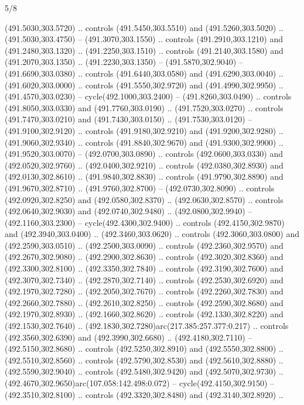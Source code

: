 \begin{flagdescription}{5/8}
\begin{scope}[xshift=0.5\flaglength,yshift=0.5\flagwidth,scale=\flagwidth/475.63]
\begin{scope}[y=0.8pt, x=0.8pt, yscale=-1, xscale=1,shift={(-450,-300)}]
\begin{scope}[cm={{1.0,0.0,0.0,1.0,(-0.0002,0.12556)}},cm={{1.0,0.0,0.0,1.0,(0.00179,0.0)}}]
\begin{scope}[cm={{1.11592,0.0,0.0,1.11592,(-106.89933,-41.77764)}}]
\begin{scope}[draw=black,fill=cfff]
\begin{scope}[fill=black]
  (491.5030,303.5720) .. controls (491.5450,303.5510) and (491.5260,303.5020) ..
  (491.5030,303.4750) -- (491.3070,303.1550) .. controls (491.2910,303.1210) and
  (491.2480,303.1320) .. (491.2250,303.1510) .. controls (491.2140,303.1580) and
  (491.2070,303.1350) .. (491.2230,303.1350) -- (491.5870,302.9040) --
  (491.6690,303.0380) .. controls (491.6440,303.0580) and (491.6290,303.0040) ..
  (491.6020,303.0000) .. controls (491.5550,302.9720) and (491.4990,302.9950) ..
  (491.4570,303.0230) -- cycle(492.1000,303.2400) -- (491.8260,303.0490) ..
  controls (491.8050,303.0330) and (491.7760,303.0190) .. (491.7520,303.0270) ..
  controls (491.7470,303.0210) and (491.7430,303.0150) .. (491.7530,303.0120) --
  (491.9100,302.9120) .. controls (491.9180,302.9210) and (491.9200,302.9280) ..
  (491.9060,302.9340) .. controls (491.8840,302.9670) and (491.9300,302.9900) ..
  (491.9520,303.0070) -- (492.0700,303.0890) .. controls (492.0600,303.0330) and
  (492.0520,302.9760) .. (492.0400,302.9210) .. controls (492.0380,302.8930) and
  (492.0130,302.8610) .. (491.9840,302.8830) .. controls (491.9790,302.8890) and
  (491.9670,302.8710) .. (491.9760,302.8700) -- (492.0730,302.8090) .. controls
  (492.0920,302.8250) and (492.0580,302.8370) .. (492.0630,302.8570) .. controls
  (492.0640,302.9030) and (492.0740,302.9480) .. (492.0800,302.9940) --
  (492.1160,303.2300) -- cycle(492.4300,302.9400) .. controls
  (492.4150,302.9870) and (492.3940,303.0400) .. (492.3460,303.0620) .. controls
  (492.3060,303.0800) and (492.2590,303.0510) .. (492.2500,303.0090) .. controls
  (492.2360,302.9570) and (492.2670,302.9080) .. (492.2900,302.8630) .. controls
  (492.3020,302.8360) and (492.3300,302.8100) .. (492.3350,302.7840) .. controls
  (492.3190,302.7600) and (492.3070,302.7340) .. (492.2870,302.7140) .. controls
  (492.2530,302.6920) and (492.1970,302.7280) .. (492.2050,302.7670) .. controls
  (492.2260,302.7830) and (492.2660,302.7880) .. (492.2610,302.8250) .. controls
  (492.2590,302.8680) and (492.1970,302.8930) .. (492.1660,302.8620) .. controls
  (492.1330,302.8220) and (492.1530,302.7640) ..
  (492.1830,302.7280)arc(217.385:257.377:0.217) .. controls (492.3560,302.6390)
  and (492.3990,302.6680) .. (492.4180,302.7110) -- (492.5150,302.8680) ..
  controls (492.5250,302.8910) and (492.5550,302.8800) .. (492.5510,302.8560) ..
  controls (492.5790,302.8530) and (492.5610,302.8880) .. (492.5590,302.9040) ..
  controls (492.5480,302.9420) and (492.5070,302.9730) ..
  (492.4670,302.9650)arc(107.058:142.498:0.072) -- cycle(492.4150,302.9150) --
  (492.3510,302.8100) .. controls (492.3320,302.8480) and (492.3140,302.8920) ..

\end{scope}
\end{scope}
\end{scope}
\end{scope}
\end{scope}
\end{scope}
\end{flagdescription}
